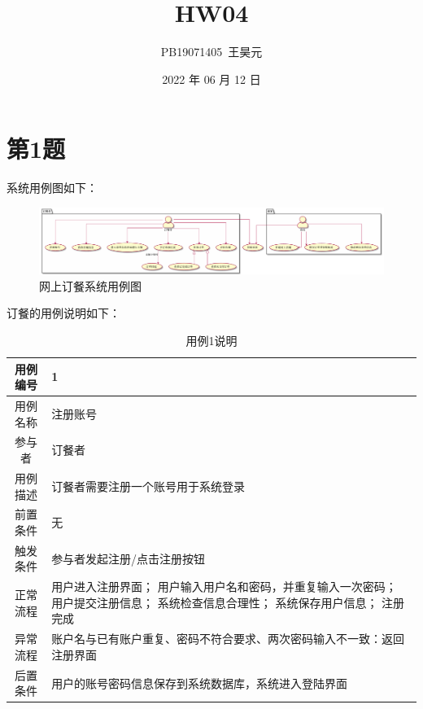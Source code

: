 \documentclass{article}
\title{HW04}
\author{PB19071405\ 王昊元}
\date{2022 年 06 月 12 日}
\begin{document}
    \maketitle

    \section*{第1题}
    系统用例图如下：
    \begin{figure}[H]
        \centering
        \includegraphics[width=\textwidth]{./fig/hw04/1.pdf}
        \caption{网上订餐系统用例图}
    \end{figure}
    订餐的用例说明如下：
    \begin{table}[H]
        \centering
        \caption{用例1说明}
        \begin{tabular}{cm{12cm}}
            \hline
            用例编号 & 1 \\
            \hline
            用例名称 & 注册账号 \\
            \hline
            参与者 & 订餐者 \\
            \hline
            用例描述 & 订餐者需要注册一个账号用于系统登录 \\
            \hline
            前置条件 & 无 \\
            \hline
            触发条件 & 参与者发起注册/点击注册按钮 \\
            \hline
            正常流程 & 用户进入注册界面； 用户输入用户名和密码，并重复输入一次密码； 用户提交注册信息； 系统检查信息合理性； 系统保存用户信息； 注册完成 \\
            \hline
            异常流程 & 账户名与已有账户重复、密码不符合要求、两次密码输入不一致：返回注册界面 \\
            \hline
            后置条件 & 用户的账号密码信息保存到系统数据库，系统进入登陆界面 \\
            \hline
        \end{tabular}
    \end{table}
\end{document}
